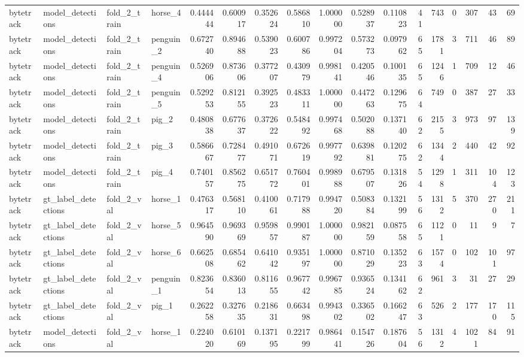 \begin{table}
\begin{tabular}{llllrrrrrrrrrrrrr}
bytetrack & model_detections & fold_2_train & horse_4 & 0.444444 & 0.600917 & 0.352624 & 0.586810 & 1.000000 & 0.528937 & 0.110823 & 41 & 743 & 0 & 307 & 43 & 69 \\
bytetrack & model_detections & fold_2_train & penguin_2 & 0.672740 & 0.894688 & 0.539023 & 0.600786 & 0.997204 & 0.573273 & 0.097962 & 65 & 1781 & 3 & 711 & 46 & 89 \\
bytetrack & model_detections & fold_2_train & penguin_4 & 0.526906 & 0.873606 & 0.377207 & 0.430979 & 0.998141 & 0.420546 & 0.100135 & 65 & 1246 & 1 & 709 & 12 & 46 \\
bytetrack & model_detections & fold_2_train & penguin_5 & 0.529253 & 0.812155 & 0.392523 & 0.483311 & 1.000000 & 0.447263 & 0.129675 & 64 & 749 & 0 & 387 & 27 & 33 \\
bytetrack & model_detections & fold_2_train & pig_2 & 0.480838 & 0.677637 & 0.372622 & 0.548492 & 0.997468 & 0.502088 & 0.137140 & 62 & 2155 & 3 & 973 & 97 & 139 \\
bytetrack & model_detections & fold_2_train & pig_3 & 0.586667 & 0.728477 & 0.491071 & 0.672619 & 0.997792 & 0.639881 & 0.120275 & 62 & 1344 & 2 & 440 & 42 & 92 \\
bytetrack & model_detections & fold_2_train & pig_4 & 0.740157 & 0.856275 & 0.651772 & 0.760401 & 0.998988 & 0.679507 & 0.131826 & 54 & 1298 & 1 & 311 & 104 & 123 \\
bytetrack & gt_label_detections & fold_2_val & horse_1 & 0.476317 & 0.568110 & 0.410061 & 0.717988 & 0.994720 & 0.508384 & 0.132199 & 56 & 1312 & 5 & 370 & 270 & 211 \\
bytetrack & gt_label_detections & fold_2_val & horse_5 & 0.964590 & 0.969369 & 0.959857 & 0.990187 & 1.000000 & 0.982159 & 0.087558 & 65 & 1121 & 0 & 11 & 9 & 7 \\
bytetrack & gt_label_detections & fold_2_val & horse_6 & 0.662508 & 0.685462 & 0.641042 & 0.935197 & 1.000000 & 0.871029 & 0.135223 & 63 & 1574 & 0 & 102 & 101 & 97 \\
bytetrack & gt_label_detections & fold_2_val & penguin_1 & 0.823654 & 0.836013 & 0.811655 & 0.967742 & 0.996785 & 0.936524 & 0.134162 & 62 & 961 & 3 & 31 & 27 & 29 \\
bytetrack & gt_label_detections & fold_2_val & pig_1 & 0.262258 & 0.327635 & 0.218631 & 0.663498 & 0.994302 & 0.336502 & 0.166247 & 63 & 526 & 2 & 177 & 170 & 115 \\
bytetrack & model_detections & fold_2_val & horse_1 & 0.224020 & 0.610169 & 0.137195 & 0.221799 & 0.986441 & 0.154726 & 0.187604 & 56 & 1312 & 4 & 1021 & 84 & 91 \\

\end{tabular}
\end{table}
